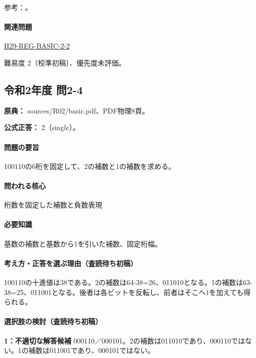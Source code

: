 \par 参考：\cite{oracle_single}。

\paragraph{関連問題} \hyperref[q:h29-reg-basic-2-2]{H29-REG-BASIC-2-2}

\par 難易度 2（校準初稿）、優先度未評価。

\subsection{令和2年度 問2-4}
\label{q:r02-reg-basic-2-4}

\noindent\textbf{原典：} sources/R02/basic.pdf、PDF物理8頁。

\textbf{公式正答：} 2（single）。

\paragraph{問題の要旨} 100110の6桁を固定して、2の補数と1の補数を求める。

\paragraph{問われる核心} 桁数を固定した補数と負数表現

\paragraph{必要知識} 基数の補数と基数から1を引いた補数、固定桁幅。

\paragraph{考え方・正答を選ぶ理由（査読待ち初稿）} 100110の十進値は38である。2の補数は64-38=\allowbreak{}26、011010となる。1の補数は63-38=\allowbreak{}25、011001となる。後者は各ビットを反転し、前者はそこへ1を加えても得られる。

\paragraph{選択肢の検討（査読待ち初稿）}\mbox{}\par

\noindent\textbf{1：不適切な解答候補} 000110／000101。2の補数は011010であり、000110ではない。1の補数は011001であり、000101ではない。\par

